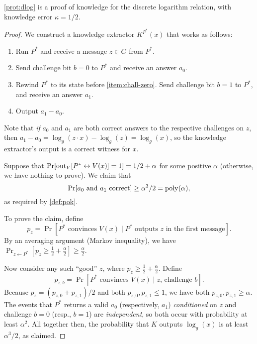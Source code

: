 \documentclass[11pt]{article}
\begin{document}
\begin{theorem}
  \cref{prot:dlog} is a proof of knowledge for the discrete
  logarithm relation, with knowledge error $\kappa = 1/2$.
\end{theorem}

\begin{proof}
  We construct a knowledge extractor $K^{P^{*}}(x)$ that works as
  follows:
  \begin{enumerate}
  \item Run $P^{*}$ and receive a message $z \in G$ from $P^{*}$.
  \item Send challenge bit $b = 0$ to $P^{*}$ and receive an answer
    $a_{0}$.\label{item:chall-zero}
  \item Rewind $P^{*}$ to its state before \cref{item:chall-zero}.
    Send challenge bit $b = 1$ to $P^{*}$, and receive an answer
    $a_{1}$.
  \item Output $a_{1} - a_{0}$.
  \end{enumerate}

  Note that \emph{if} $a_{0}$ and $a_{1}$ are both correct answers to
  the respective challenges on $z$, then $a_{1} - a_{0} = \log_{g}(z
  \cdot x) - \log_{g}(z) = \log_{g}(x)$, so the knowledge extractor's
  output is a correct witness for $x$.

  Suppose that $\Pr[\text{out}_{V}[P^{*} \leftrightarrow V(x)] = 1] = 1/2 +
  \alpha$ for some positive $\alpha$ (otherwise, we have nothing to
  prove).  We claim that \[ \Pr[a_{0} \text{ and } a_{1} \text{
    correct}] \geq \alpha^{3}/2 = \operatorname{poly}(\alpha), \] as required by
  \cref{def:pok}.

  To prove the claim, define \[ p_{z} = \Pr[P^{*} \text{ convinces }
  V(x) \mid P^{*} \text{ outputs $z$ in the first message}]. \] By an
  averaging argument (Markov inequality), we have $\Pr_{z \gets
    P^{*}}[p_{z} \geq \tfrac{1}{2} + \tfrac{\alpha}{2}] \geq
  \frac{\alpha}{2}$.

  Now consider any such ``good'' $z$, where $p_{z} \geq \tfrac12 +
  \tfrac{\alpha}{2}$.  Define \[ p_{z, b} = \Pr[P^{*} \text{ convinces
  } V(x) \mid z \text{, challenge $b$}]. \] Because $p_{z} = (p_{z,0}
  + p_{z,1})/2$ and both $p_{z,0}, p_{z,1} \leq 1$, we have both
  $p_{z, 0}, p_{z, 1} \geq \alpha$.  The events that $P^{*}$ returns a
  valid $a_{0}$ (respectively, $a_{1}$) \emph{conditioned} on $z$ and
  challenge $b=0$ (resp., $b=1$) are \emph{independent}, so both occur
  with probability at least $\alpha^{2}$.  All together then, the
  probability that $K$ outputs $\log_{g}(x)$ is at least
  $\alpha^{3}/2$, as claimed.

\end{proof}
\end{document}
